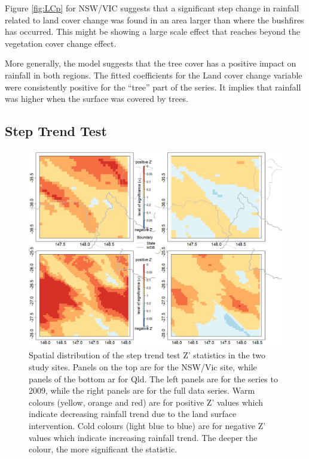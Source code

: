 \documentclass[]{elsarticle} %
\theoremstyle{definition}
\theoremstyle{definition}
\theoremstyle{definition}
\theoremstyle{remark}
\begin{document}
Figure \ref{fig:LCp} for NSW/VIC suggests that a significant step change
in rainfall related to land cover change was found in an area larger
than where the bushfires has occurred. This might be showing a large
scale effect that reaches beyond the vegetation cover change effect.

More generally, the model suggests that the tree cover has a positive
impact on rainfall in both regions. The fitted coefficients for the Land
cover change variable were consistently positive for the ``tree'' part
of the series. It implies that rainfall was higher when the surface was
covered by trees.

\subsection{Step Trend Test}\label{step-trend-test-2}

\begin{figure}
\includegraphics[width=0.9\linewidth]{figures/step_new} \caption{Spatial distribution of the step trend test Z' statistics in the two study sites. Panels on the top are for the NSW/Vic site, while panels of the bottom ar for Qld. The left panels are for the series to 2009, while the right panels are for the full data series. Warm colours (yellow, orange and red) are for positive Z' values which indicate decreasing rainfall trend due to the land surface intervention. Cold colours (light blue to blue) are for negative Z' values which indicate increasing rainfall trend. The deeper the colour, the more significant the statistic.}\label{fig:steptest30}
\end{figure}
\end{document}
